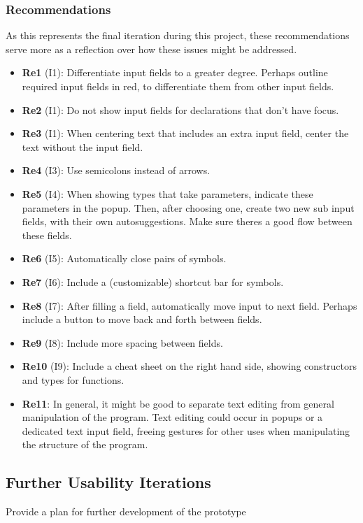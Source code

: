 \subsubsection{Recommendations}
\label{sec:second_recommendations}
As this represents the final iteration during this project, these
recommendations serve more as a reflection over how these issues might be
addressed.

\begin{itemize}
    \item \textbf{Re1} (I1): Differentiate input fields to a greater degree. Perhaps outline required input fields in red, to differentiate them from other input fields.
    \item \textbf{Re2} (I1): Do not show input fields for declarations that don’t have focus.
    \item \textbf{Re3} (I1): When centering text that includes an extra input field, center the text without the input field. 
    \item \textbf{Re4} (I3): Use semicolons instead of arrows.
    \item \textbf{Re5} (I4): When showing types that take parameters, indicate these parameters in the popup. Then, after choosing one, create two new sub input fields, with their own autosuggestions. Make sure theres a good flow between these fields.
    \item \textbf{Re6} (I5): Automatically close pairs of symbols.
    \item \textbf{Re7} (I6): Include a (customizable) shortcut bar for symbols.
    \item \textbf{Re8} (I7): After filling a field, automatically move input to next field. Perhaps include a button to move back and forth between fields.
    \item \textbf{Re9} (I8): Include more spacing between fields.
    \item \textbf{Re10} (I9): Include a cheat sheet on the right hand side, showing constructors and types for functions.
    \item \textbf{Re11}: In general, it might be good to separate text editing from general manipulation of the program. Text editing could occur in popups or a dedicated text input field, freeing gestures for other uses when manipulating the structure of the program.
\end{itemize}


\subsection{Further Usability Iterations}
Provide a plan for further development of the prototype

